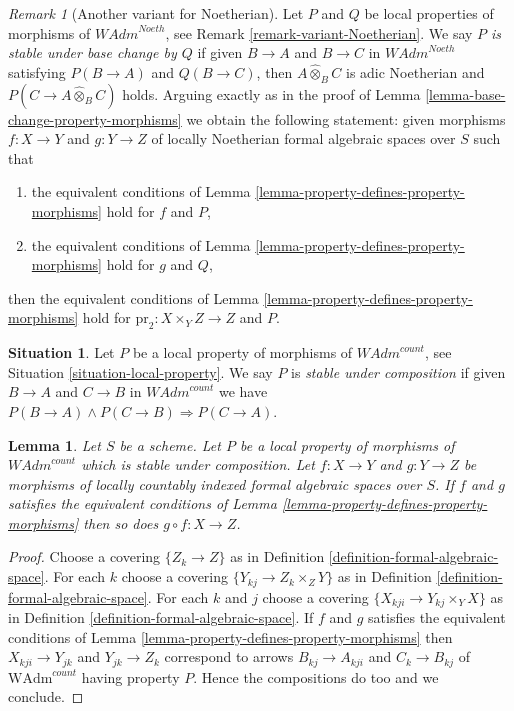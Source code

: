 \documentclass{stacks-project}
\theoremstyle{plain}
\newtheorem{lemma}[subsection]{Lemma}
\theoremstyle{definition}
\newtheorem{situation}[subsection]{Situation}
\theoremstyle{remark}
\newtheorem{remark}[subsection]{Remark}
\numberwithin{equation}{subsection}
\begin{document}
\begin{remark}[Another variant for Noetherian]
\label{remark-base-change-variant-variant-Noetherian}
Let $P$ and $Q$ be local properties of morphisms of
$\textit{WAdm}^{Noeth}$, see Remark \ref{remark-variant-Noetherian}.
We say {\it $P$ is stable under base change by $Q$}
if given $B \to A$ and $B \to C$ in $\textit{WAdm}^{Noeth}$
satisfying $P(B \to A)$ and $Q(B \to C)$, then
$A \widehat{\otimes}_B C$ is adic Noetherian and
$P(C \to A \widehat{\otimes}_B C)$ holds.
Arguing exactly as in the proof of
Lemma \ref{lemma-base-change-property-morphisms}
we obtain the following statement:
given morphisms $f : X \to Y$ and $g : Y \to Z$ of
locally Noetherian formal algebraic spaces over $S$
such that
\begin{enumerate}
\item the equivalent conditions of
Lemma \ref{lemma-property-defines-property-morphisms}
hold for $f$ and $P$,
\item the equivalent conditions of
Lemma \ref{lemma-property-defines-property-morphisms}
hold for $g$ and $Q$,
\end{enumerate}
then the equivalent conditions of
Lemma \ref{lemma-property-defines-property-morphisms}
hold for $\text{pr}_2 : X \times_Y Z \to Z$ and $P$.
\end{remark}

\begin{situation}
\label{situation-composition-local-property}
Let $P$ be a local property of morphisms of $\textit{WAdm}^{count}$, see
Situation \ref{situation-local-property}. We say $P$ is {\it stable under
composition} if given $B \to A$ and $C \to B$ in $\textit{WAdm}^{count}$
we have $P(B \to A) \wedge P(C \to B) \Rightarrow P(C \to A)$.
\end{situation}

\begin{lemma}
\label{lemma-composition-property-morphisms}
Let $S$ be a scheme. Let $P$ be a local property of morphisms of
$\textit{WAdm}^{count}$ which is stable under composition.
Let $f : X \to Y$ and $g : Y \to Z$ be morphisms of locally countably indexed
formal algebraic spaces over $S$. If $f$ and $g$
satisfies the equivalent conditions of
Lemma \ref{lemma-property-defines-property-morphisms}
then so does $g \circ f : X \to Z$.
\end{lemma}

\begin{proof}
Choose a covering $\{Z_k \to Z\}$ as in
Definition \ref{definition-formal-algebraic-space}.
For each $k$ choose a covering $\{Y_{kj} \to Z_k \times_Z Y\}$
as in Definition \ref{definition-formal-algebraic-space}.
For each $k$ and $j$ choose a covering $\{X_{kji} \to Y_{kj} \times_Y X\}$
as in Definition \ref{definition-formal-algebraic-space}.
If $f$ and $g$
satisfies the equivalent conditions of
Lemma \ref{lemma-property-defines-property-morphisms}
then $X_{kji} \to Y_{jk}$ and $Y_{jk} \to Z_k$
correspond to arrows
$B_{kj} \to A_{kji}$ and $C_k \to B_{kj}$ of
$\text{WAdm}^{count}$ having property $P$.
Hence the compositions do too and we conclude.
\end{proof}
\end{document}
